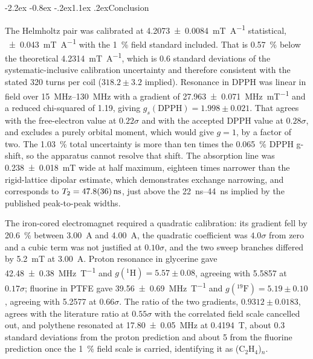 \documentclass[11pt,a4paper]{article}
\makeatletter
\renewcommand\section{\@startsection{section}{1}{\z@}%
  {-2.2ex \@plus -0.8ex \@minus -.2ex}{1.1ex \@plus .2ex}{\normalfont\large\bfseries}}
\makeatother
\begin{document}
\section{Conclusion}

The Helmholtz pair was calibrated at \SI{4.2073 \pm 0.0084}{\milli\tesla\per\ampere} statistical,
\SI{\pm 0.043}{\milli\tesla\per\ampere} with the \SI{1}{\percent} field standard included. That is
\SI{0.57}{\percent} below the theoretical \SI{4.2314}{\milli\tesla\per\ampere}, which is 0.6
standard deviations of the systematic-inclusive calibration uncertainty and therefore consistent
with the stated 320 turns per coil ($318.2 \pm 3.2$ implied). Resonance in DPPH was linear in
field over
\SIrange{15}{130}{\mega\hertz} with a gradient of
\SI{27.963 \pm 0.071}{\mega\hertz\per\milli\tesla} and a reduced chi-squared of 1.19, giving
$g_s(\mathrm{DPPH}) = 1.998 \pm 0.021$. That agrees with the free-electron value at $0.22\sigma$
and with the accepted DPPH value at $0.28\sigma$, and excludes a purely orbital moment, which would
give $g = 1$, by a factor of two. The \SI{1.03}{\percent} total uncertainty is more than ten times
the \SI{0.065}{\percent} DPPH g-shift, so the apparatus cannot resolve that shift. The absorption
line was \SI{0.238 \pm 0.018}{\milli\tesla} wide at half maximum, eighteen times narrower than the
rigid-lattice dipolar estimate, which demonstrates exchange narrowing, and corresponds to
$T_2 = \SI{47.8 \pm 3.6}{\nano\second}$, just above the \SIrange{22}{44}{\nano\second} implied by
the published peak-to-peak widths.

The iron-cored electromagnet required a quadratic calibration: its gradient fell by
\SI{20.6}{\percent} between \SI{3.00}{\ampere} and \SI{4.00}{\ampere}, the quadratic coefficient
was $4.0\sigma$ from zero and a cubic term was not justified at $0.10\sigma$, and the two sweep
branches differed by \SI{5.2}{\milli\tesla} at \SI{3.00}{\ampere}. Proton resonance in glycerine
gave \SI{42.48 \pm 0.38}{\mega\hertz\per\tesla} and $g(^{1}\mathrm{H}) = 5.57 \pm 0.08$,
agreeing with 5.5857 at $0.17\sigma$; fluorine in PTFE gave
\SI{39.56 \pm 0.69}{\mega\hertz\per\tesla} and $g(^{19}\mathrm{F}) = 5.19 \pm 0.10$, agreeing
with 5.2577 at $0.66\sigma$. The ratio of the two gradients, $0.9312 \pm 0.0183$, agrees with the
literature ratio at $0.55\sigma$ with the correlated field scale cancelled out, and polythene
resonated at \SI{17.80 \pm 0.05}{\mega\hertz} at \SI{0.4194}{\tesla}, about 0.3 standard
deviations from the proton prediction and about 5 from the fluorine prediction once the
\SI{1}{\percent} field scale is carried, identifying it as (C$_2$H$_4$)$_n$.
\end{document}

